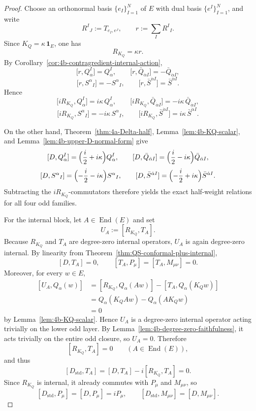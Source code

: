 \begin{proof}
Choose an orthonormal basis \(\{e_I\}_{I=1}^N\) of \(E\) with dual basis
\(\{e^I\}_{I=1}^N\), and write
\[
R^I{}_J:=T_{e_I,e^J},
\qquad
r:=\sum_I R^I{}_I.
\]
Since \(K_Q=\kappa\,\mathbf 1_E\), one has
\[
R_{K_Q}=\kappa r.
\]
By Corollary~\ref{cor:4b-contragredient-internal-action},
\[
\bigl[r,Q_\alpha^I\bigr]=Q_\alpha^I,
\qquad
\bigl[r,\bar Q_{\dot\alpha I}\bigr]=-\bar Q_{\dot\alpha I},
\]
\[
\bigl[r,S^\alpha{}_I\bigr]=-S^\alpha{}_I,
\qquad
\bigl[r,\bar S^{\dot\alpha I}\bigr]=\bar S^{\dot\alpha I}.
\]
Hence
\[
\bigl[iR_{K_Q},Q_\alpha^I\bigr]=i\kappa\,Q_\alpha^I,
\qquad
\bigl[iR_{K_Q},\bar Q_{\dot\alpha I}\bigr]=-i\kappa\,\bar Q_{\dot\alpha I},
\]
\[
\bigl[iR_{K_Q},S^\alpha{}_I\bigr]=-i\kappa\,S^\alpha{}_I,
\qquad
\bigl[iR_{K_Q},\bar S^{\dot\alpha I}\bigr]=i\kappa\,\bar S^{\dot\alpha I}.
\]

On the other hand, Theorem~\ref{thm:4a-Delta-half},
Lemma~\ref{lem:4b-KQ-scalar}, and
Lemma~\ref{lem:4b-upper-D-normal-form} give
\[
[D,Q_\alpha^I]
=
\Bigl(\frac{i}{2}+i\kappa\Bigr)Q_\alpha^I,
\qquad
[D,\bar Q_{\dot\alpha I}]
=
\Bigl(\frac{i}{2}-i\kappa\Bigr)\bar Q_{\dot\alpha I},
\]
\[
[D,S^\alpha{}_I]
=
\Bigl(-\frac{i}{2}-i\kappa\Bigr)S^\alpha{}_I,
\qquad
[D,\bar S^{\dot\alpha I}]
=
\Bigl(-\frac{i}{2}+i\kappa\Bigr)\bar S^{\dot\alpha I}.
\]
Subtracting the \(iR_{K_Q}\)-commutators therefore yields the exact half-weight
relations for all four odd families.

For the internal block, let \(A\in\operatorname{End}(E)\) and set
\[
  U_A:=[R_{K_Q},T_A].
\]
Because \(R_{K_Q}\) and \(T_A\) are degree-zero internal operators,
\(U_A\) is again degree-zero internal. By linearity from
Theorem~\ref{thm:QS-conformal-plus-internal},
\[
[D,T_A]=0,
\qquad
[T_A,P_\mu]=[T_A,M_{\mu\nu}]=0.
\]
Moreover, for every \(w\in E\),
\[
\begin{aligned}
[U_A,Q_\alpha(w)]
&=
[R_{K_Q},Q_\alpha(Aw)]-[T_A,Q_\alpha(K_Qw)]\\
&=
Q_\alpha(K_QAw)-Q_\alpha(AK_Qw)\\
&= 
0
\end{aligned}
\]
by Lemma~\ref{lem:4b-KQ-scalar}. Hence \(U_A\) is a degree-zero internal
operator acting trivially on the lower odd layer. By
Lemma~\ref{lem:4b-degree-zero-faithfulness}, it acts trivially on the entire odd
closure, so \(U_A=0\). Therefore
\[
[R_{K_Q},T_A]=0
\qquad
(A\in\operatorname{End}(E)),
\]
and thus
\[
  [D_{\mathrm{std}},T_A]
  =
  [D,T_A]-i[R_{K_Q},T_A]
  =
  0.
\]
Since \(R_{K_Q}\) is internal, it already commutes with \(P_\mu\) and
\(M_{\mu\nu}\), so
\[
[D_{\mathrm{std}},P_\mu]=[D,P_\mu]=iP_\mu,
\qquad
[D_{\mathrm{std}},M_{\mu\nu}]=[D,M_{\mu\nu}].
\]
\end{proof}

